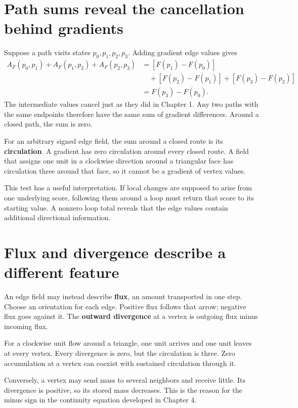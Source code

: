 \documentclass[11pt,oneside,openany]{book}
\theoremstyle{definition}
\theoremstyle{remark}
\numberwithin{equation}{chapter}
\begin{document}
\section{Path sums reveal the cancellation behind gradients}\label{ch03-path-sums-reveal-the-cancellation-behind-gradients}

Suppose a path visits states \(p_0,p_1,p_2,p_3\). Adding gradient edge values gives \[\begin{aligned}
A_F(p_0,p_1)+A_F(p_1,p_2)+A_F(p_2,p_3)
&=[F(p_1)-F(p_0)]\\
&\quad+[F(p_2)-F(p_1)]+[F(p_3)-F(p_2)]\\
&=F(p_3)-F(p_0).
\end{aligned}\] The intermediate values cancel just as they did in Chapter 1. Any two paths with the same endpoints therefore have the same sum of gradient differences. Around a closed path, the sum is zero.

For an arbitrary signed edge field, the sum around a closed route is its \textbf{circulation}. A gradient has zero circulation around every closed route. A field that assigns one unit in a clockwise direction around a triangular face has circulation three around that face, so it cannot be a gradient of vertex values.

This test has a useful interpretation. If local changes are supposed to arise from one underlying score, following them around a loop must return that score to its starting value. A nonzero loop total reveals that the edge values contain additional directional information.

\section{Flux and divergence describe a different feature}\label{ch03-flux-and-divergence-describe-a-different-feature}

An edge field may instead describe \textbf{flux}, an amount transported in one step. Choose an orientation for each edge. Positive flux follows that arrow; negative flux goes against it. The \textbf{outward divergence} at a vertex is outgoing flux minus incoming flux.

For a clockwise unit flow around a triangle, one unit arrives and one unit leaves at every vertex. Every divergence is zero, but the circulation is three. Zero accumulation at a vertex can coexist with sustained circulation through it.

Conversely, a vertex may send mass to several neighbors and receive little. Its divergence is positive, so its stored mass decreases. This is the reason for the minus sign in the continuity equation developed in Chapter 4.
\end{document}
